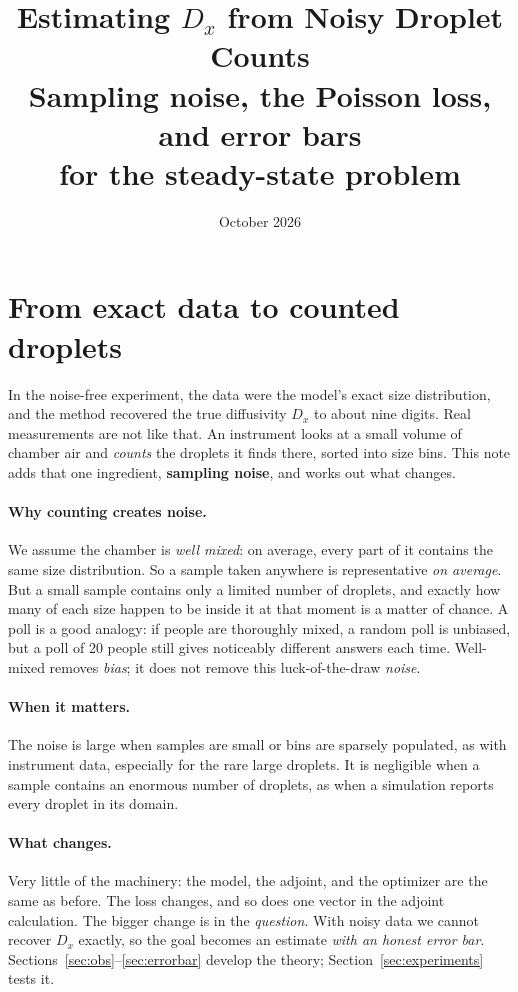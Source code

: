 \documentclass[11pt]{article}
\title{\textbf{Estimating $D_x$ from Noisy Droplet Counts}\\[4pt]
\large Sampling noise, the Poisson loss, and error bars\\ for the steady-state problem}
\date{October 2026}
\author{}
\begin{document}
\maketitle
\vspace{-2em}
\tableofcontents

\section{From exact data to counted droplets}
In the noise-free experiment, the data were the model's exact size distribution, and the method recovered the true diffusivity $D_x$ to about nine digits. Real measurements are not like that. An instrument looks at a small volume of chamber air and \emph{counts} the droplets it finds there, sorted into size bins. This note adds that one ingredient, \textbf{sampling noise}, and works out what changes.

\paragraph{Why counting creates noise.} We assume the chamber is \emph{well mixed}: on average, every part of it contains the same size distribution. So a sample taken anywhere is representative \emph{on average}. But a small sample contains only a limited number of droplets, and exactly how many of each size happen to be inside it at that moment is a matter of chance. A poll is a good analogy: if people are thoroughly mixed, a random poll is unbiased, but a poll of 20 people still gives noticeably different answers each time. Well-mixed removes \emph{bias}; it does not remove this luck-of-the-draw \emph{noise}.

\paragraph{When it matters.} The noise is large when samples are small or bins are sparsely populated, as with instrument data, especially for the rare large droplets. It is negligible when a sample contains an enormous number of droplets, as when a simulation reports every droplet in its domain.

\paragraph{What changes.} Very little of the machinery: the model, the adjoint, and the optimizer are the same as before. The loss changes, and so does one vector in the adjoint calculation. The bigger change is in the \emph{question}. With noisy data we cannot recover $D_x$ exactly, so the goal becomes an estimate \emph{with an honest error bar}. Sections~\ref{sec:obs}--\ref{sec:errorbar} develop the theory; Section~\ref{sec:experiments} tests it.
\end{document}
